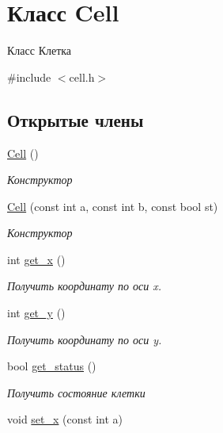 \hypertarget{classCell}{\section{Класс Cell}
\label{classCell}
}


Класс Клетка  




{\ttfamily \#include $<$cell.\+h$>$}

\subsection*{Открытые члены}
\begin{DoxyCompactItemize}
\item 
\hypertarget{classCell_a394510643e8664cf12b5efaf5cb99f71}{\hyperlink{classCell_a394510643e8664cf12b5efaf5cb99f71}{Cell} ()}\label{classCell_a394510643e8664cf12b5efaf5cb99f71}

\begin{DoxyCompactList}\small\item\em Конструктор \end{DoxyCompactList}\item 
\hyperlink{classCell_ac0f95844f9717e8eb46bda2940e37556}{Cell} (const int a, const int b, const bool st)
\begin{DoxyCompactList}\small\item\em Конструктор \end{DoxyCompactList}\item 
int \hyperlink{classCell_a00989b383714d8f6d051677b96a3adcb}{get\+\_\+x} ()
\begin{DoxyCompactList}\small\item\em Получить координату по оси x. \end{DoxyCompactList}\item 
int \hyperlink{classCell_a957598cfc79e75ae651126173425d3fc}{get\+\_\+y} ()
\begin{DoxyCompactList}\small\item\em Получить координату по оси y. \end{DoxyCompactList}\item 
bool \hyperlink{classCell_a5e113f816cd4750eccd1846af81845ac}{get\+\_\+status} ()
\begin{DoxyCompactList}\small\item\em Получить состояние клетки \end{DoxyCompactList}\item 
\hypertarget{classCell_a6f1ad5d04d79f0d7e0b3c8587dcb6c4b}{void \hyperlink{classCell_a6f1ad5d04d79f0d7e0b3c8587dcb6c4b}{set\+\_\+x} (const int a)}\label{classCell_a6f1ad5d04d79f0d7e0b3c8587dcb6c4b}


\end{DoxyCompactItemize}
